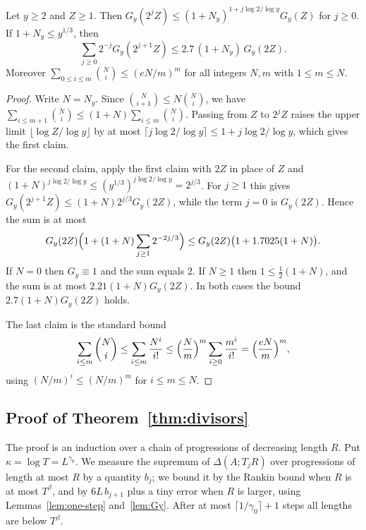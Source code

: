 \begin{lemma}\label{lem:Gy}
Let $y\ge2$ and $Z\ge1$. Then $G_y(2^jZ)\le(1+N_y)^{1+j\log2/\log y}G_y(Z)$ for $j\ge0$. If $1+N_y\le y^{1/3}$, then
\[
\sum_{j\ge0}2^{-j}G_y(2^{j+1}Z)\le2.7\,(1+N_y)\,G_y(2Z).
\]
Moreover $\sum_{0\le i\le m}\binom Ni\le(eN/m)^m$ for all integers $N,m$ with $1\le m\le N$.
\end{lemma}

\begin{proof}
Write $N=N_y$. Since $\binom N{i+1}\le N\binom Ni$, we have $\sum_{i\le m+1}\binom Ni\le(1+N)\sum_{i\le m}\binom Ni$. Passing from $Z$ to $2^jZ$ raises the upper limit $\lfloor\log Z/\log y\rfloor$ by at most $\lceil j\log2/\log y\rceil\le1+j\log2/\log y$, which gives the first claim.

For the second claim, apply the first claim with $2Z$ in place of $Z$ and $(1+N)^{j\log2/\log y}\le(y^{1/3})^{j\log2/\log y}=2^{j/3}$. For $j\ge1$ this gives $G_y(2^{j+1}Z)\le(1+N)2^{j/3}G_y(2Z)$, while the term $j=0$ is $G_y(2Z)$. Hence the sum is at most
\[
G_y(2Z)\Bigl(1+(1+N)\sum_{j\ge1}2^{-2j/3}\Bigr)\le G_y(2Z)\bigl(1+1.7025(1+N)\bigr).
\]
If $N=0$ then $G_y\equiv1$ and the sum equals $2$. If $N\ge1$ then $1\le\frac12(1+N)$, and the sum is at most $2.21(1+N)G_y(2Z)$. In both cases the bound $2.7(1+N)G_y(2Z)$ holds.

The last claim is the standard bound
\[
\sum_{i\le m}\binom Ni\le\sum_{i\le m}\frac{N^i}{i!}\le\Bigl(\frac Nm\Bigr)^m\sum_{i\ge0}\frac{m^i}{i!}=\Bigl(\frac{eN}m\Bigr)^m ,
\]
using $(N/m)^i\le(N/m)^m$ for $i\le m\le N$.
\end{proof}

\subsection{Proof of Theorem~\ref{thm:divisors}}\label{subsec:proof-divisors}

The proof is an induction over a chain of progressions of decreasing length $R$. Put $\kappa=\log T=L^{\gamma_0}$. We measure the supremum of $\Delta(A;T_jR)$ over progressions of length at most $R$ by a quantity $b_j$; we bound it by the Rankin bound when $R$ is at most $T^\beta$, and by $6L\,b_{j+1}$ plus a tiny error when $R$ is larger, using Lemmas~\ref{lem:one-step} and~\ref{lem:Gy}. After at most $\lceil1/\gamma_0\rceil+1$ steps all lengths are below $T^\beta$.

